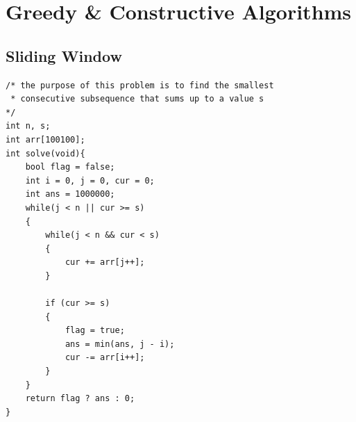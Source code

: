 \documentclass[12pt]{book}
\begin{document}
\chapter{Greedy \& Constructive Algorithms}
\section{Sliding Window}
\begin{verbatim}
/* the purpose of this problem is to find the smallest
 * consecutive subsequence that sums up to a value s
*/
int n, s;
int arr[100100];
int solve(void){
	bool flag = false;
	int i = 0, j = 0, cur = 0;
	int ans = 1000000;
	while(j < n || cur >= s)
	{
		while(j < n && cur < s)
		{
			cur += arr[j++];
		}
		
		if (cur >= s)
		{
			flag = true;
			ans = min(ans, j - i);
			cur -= arr[i++];
		}
	}
	return flag ? ans : 0;
}
\end{verbatim}
\end{document}
